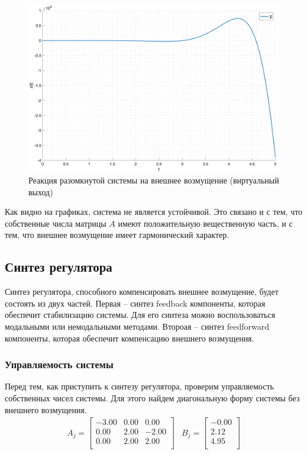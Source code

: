 \begin{figure}[ht!]
    \centering
    \includegraphics[width=\textwidth]{media/plots/open_z.png}
    \caption{Реакция разомкнутой системы на внешнее возмущение (виртуальный выход)}
    \label{fig:open_z}
\end{figure}
Как видно на графиках, система не является устойчивой. Это связано и с тем, что
собственные числа матрицы $A$ имеют положительную вещественную часть, и с тем, что
внешнее возмущение имеет гармонический характер.

\FloatBarrier
\subsection{Синтез регулятора}
Синтез регулятора, способного компенсировать внешнее возмущение, будет состоять из двух частей. 
Первая -- синтез feedback компоненты, которая обеспечит стабилизацию системы. Для его синтеза
можно воспользоваться модальными или немодальными методами. Второая -- синтез feedforward компоненты,
которая обеспечит компенсацию внешнего возмущения.

\subsubsection{Управляемость системы}
Перед тем, как приступить к синтезу регулятора, проверим управляемость собственных 
чисел системы. Для этого найдем диагональную форму системы без внешнего возмущения.
\begin{eqnarray}
    A_j = \begin{bmatrix}
        -3.00  & 0.00  & 0.00 \\ 
        0.00  & 2.00  & -2.00 \\ 
        0.00  & 2.00  & 2.00 \\ 
    \end{bmatrix} &
    B_j = \begin{bmatrix}
    -0.00 \\ 
    2.12 \\ 
    4.95 \\ 
    \end{bmatrix}
\end{eqnarray}

